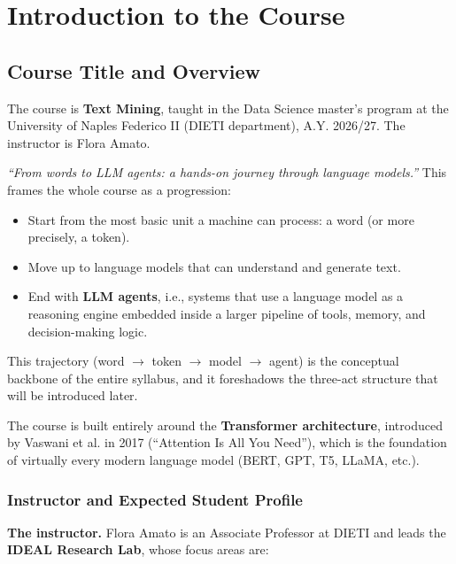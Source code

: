 


\section{Introduction to the Course}

\subsection{Course Title and Overview}

The course is \textbf{Text Mining}, taught in the Data Science master's program at the University of Naples Federico II (DIETI department), A.Y. 2026/27. The instructor is Flora Amato.

 \emph{``From words to LLM agents: a hands-on journey through language models.''} This frames the whole course as a progression:

\begin{itemize}
    \item Start from the most basic unit a machine can process: a word (or more precisely, a token).
    \item Move up to language models that can understand and generate text.
    \item End with \textbf{LLM agents}, i.e., systems that use a language model as a reasoning engine embedded inside a larger pipeline of tools, memory, and decision-making logic.
\end{itemize}

This trajectory (word $\rightarrow$ token $\rightarrow$ model $\rightarrow$ agent) is the conceptual backbone of the entire syllabus, and it foreshadows the three-act structure that will be introduced later.

\vspace{0.2cm}

The course is built entirely around the \textbf{Transformer architecture}, introduced by Vaswani et al. in 2017 (``Attention Is All You Need''), which is the foundation of virtually every modern language model (BERT, GPT, T5, LLaMA, etc.).

\subsubsection{Instructor and Expected Student Profile}

\textbf{The instructor.} Flora Amato is an Associate Professor at DIETI and leads the \textbf{IDEAL Research Lab}, whose focus areas are:

